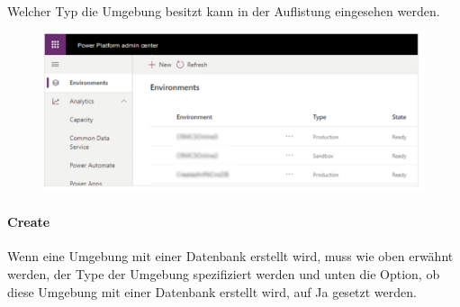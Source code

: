 Welcher Typ die Umgebung besitzt kann in der Auflistung eingesehen werden.
\begin{figure}[H]
	\centering
	\includegraphics[scale = 0.3]{attachment/chapter_13/Scc017}
\end{figure}

\paragraph*{Create \Env}
Wenn eine Umgebung mit einer Datenbank erstellt wird, muss wie oben erwähnt werden, der Type der Umgebung spezifiziert werden und unten die Option, ob diese Umgebung mit einer Datenbank erstellt wird, auf Ja gesetzt werden.
